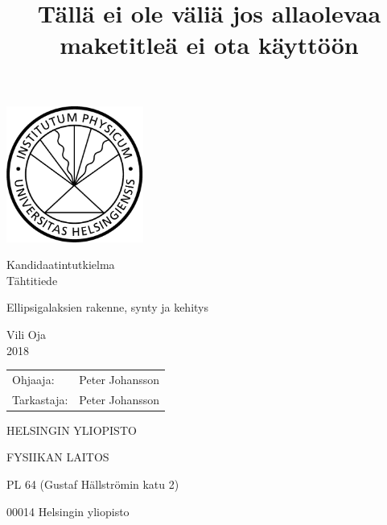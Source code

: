 \documentclass[11pt,a4paper,twoside]{report}
\begin{document}
\begin{titlepage}
\setcounter{page}{1}

\begin{center}

\vspace*{4cm}
\includegraphics[width=45mm]{vaakuna-eps-converted-to.pdf}

\vspace*{2cm}

Kandidaatintutkielma \\
Tähtitiede

\vspace{2.0cm} 
{\Large \bf
  \rule{0pt}{3ex}Ellipsigalaksien rakenne, synty ja kehitys
}

\title{
Tällä ei ole väliä jos allaolevaa maketitleä ei ota käyttöön
}

\vspace{2.0cm} 
Vili Oja \\
2018

\vspace{1.5cm} 
\begin{tabular}{ll}	Ohjaaja:	& Peter Johansson \\
			Tarkastaja: & Peter Johansson
\end{tabular}

\vspace{1.5cm} HELSINGIN YLIOPISTO

FYSIIKAN LAITOS

\vspace{0.5cm} PL 64 (Gustaf Hällströmin katu 2)

00014 Helsingin yliopisto

\end{center}

\end{titlepage}
\end{document}
